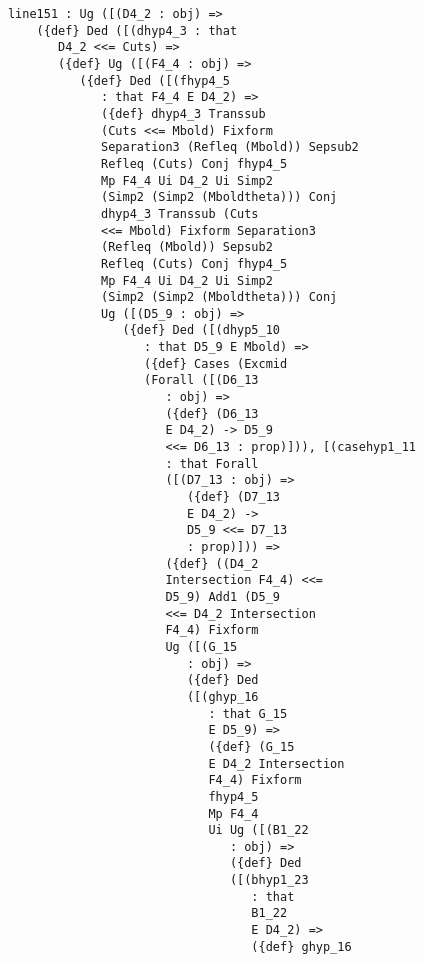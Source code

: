 \documentclass[12pt]{article}
\begin{document}
\begin{verbatim}
      line151 : Ug ([(D4_2 : obj) => 
          ({def} Ded ([(dhyp4_3 : that 
             D4_2 <<= Cuts) => 
             ({def} Ug ([(F4_4 : obj) => 
                ({def} Ded ([(fhyp4_5 
                   : that F4_4 E D4_2) => 
                   ({def} dhyp4_3 Transsub 
                   (Cuts <<= Mbold) Fixform 
                   Separation3 (Refleq (Mbold)) Sepsub2 
                   Refleq (Cuts) Conj fhyp4_5 
                   Mp F4_4 Ui D4_2 Ui Simp2 
                   (Simp2 (Simp2 (Mboldtheta))) Conj 
                   dhyp4_3 Transsub (Cuts 
                   <<= Mbold) Fixform Separation3 
                   (Refleq (Mbold)) Sepsub2 
                   Refleq (Cuts) Conj fhyp4_5 
                   Mp F4_4 Ui D4_2 Ui Simp2 
                   (Simp2 (Simp2 (Mboldtheta))) Conj 
                   Ug ([(D5_9 : obj) => 
                      ({def} Ded ([(dhyp5_10 
                         : that D5_9 E Mbold) => 
                         ({def} Cases (Excmid 
                         (Forall ([(D6_13 
                            : obj) => 
                            ({def} (D6_13 
                            E D4_2) -> D5_9 
                            <<= D6_13 : prop)])), [(casehyp1_11 
                            : that Forall 
                            ([(D7_13 : obj) => 
                               ({def} (D7_13 
                               E D4_2) -> 
                               D5_9 <<= D7_13 
                               : prop)])) => 
                            ({def} ((D4_2 
                            Intersection F4_4) <<= 
                            D5_9) Add1 (D5_9 
                            <<= D4_2 Intersection 
                            F4_4) Fixform 
                            Ug ([(G_15 
                               : obj) => 
                               ({def} Ded 
                               ([(ghyp_16 
                                  : that G_15 
                                  E D5_9) => 
                                  ({def} (G_15 
                                  E D4_2 Intersection 
                                  F4_4) Fixform 
                                  fhyp4_5 
                                  Mp F4_4 
                                  Ui Ug ([(B1_22 
                                     : obj) => 
                                     ({def} Ded 
                                     ([(bhyp1_23 
                                        : that 
                                        B1_22 
                                        E D4_2) => 
                                        ({def} ghyp_16 

\end{verbatim}
\end{document}
